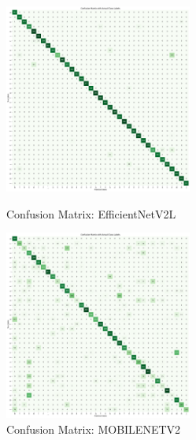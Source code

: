 \begin{figure}[h!]
    \centering
    \includegraphics[width=0.55\textwidth]{Assets/confusion_matrix/EfficientNetV2L.png}
    \caption{Confusion Matrix: EfficientNetV2L}
    \vspace{1.5cm}
    \includegraphics[width=0.55\textwidth]{Assets/confusion_matrix/MOBILENETV2.png}
    \caption{Confusion Matrix: MOBILENETV2}
\end{figure}

\newpage

